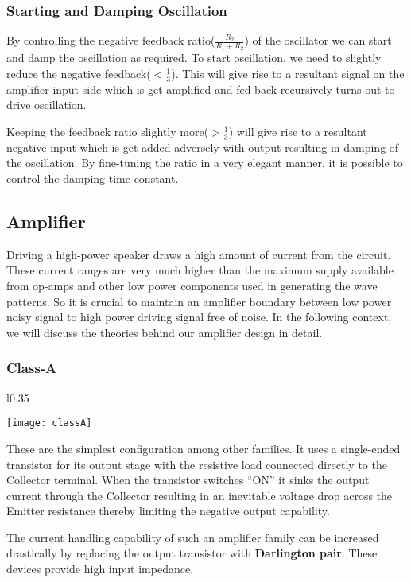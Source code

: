 \documentclass[class=article,crop=false]{standalone}
\begin{document}
\subsubsection*{Starting and Damping Oscillation}
By controlling the negative feedback ratio($\frac{R_2}{R_1+R_2}$) of the oscillator we can start and damp the oscillation as required. To start oscillation, we need to slightly reduce the negative feedback($<\frac{1}{3}$). This will give rise to a resultant signal on the amplifier input side which is get amplified and fed back recursively turns out to drive oscillation.
\par
Keeping the feedback ratio slightly more($>\frac{1}{3}$) will give rise to a resultant negative input which is get added adversely with output resulting in damping of the oscillation. By fine-tuning the ratio in a very elegant manner, it is possible to control the damping time constant.
\subsection{Amplifier}
Driving a high-power speaker draws a high amount of current from the circuit. These current ranges are very much higher than the maximum supply available from op-amps and other low power components used in generating the wave patterns. So it is crucial to maintain an amplifier boundary between low power noisy signal to high power driving signal free of noise. In the following context, we will discuss the theories behind our amplifier design in detail.
\subsubsection*{Class-A }
\begin{wrapfigure}{l}{0.35\columnwidth}
  \vspace*{-.5cm}
  \begin{center}
    \texttt{[image: classA]}
  \end{center}
  \vspace*{-.5cm}
\end{wrapfigure}
These are the simplest configuration among other families. It uses a single-ended transistor for its output stage with the resistive load connected directly to the Collector terminal. When the transistor switches “ON” it sinks the output current through the Collector resulting in an inevitable voltage drop across the Emitter resistance thereby limiting the negative output capability.  
\par 
The current handling capability of such an amplifier family can be increased drastically by replacing the output transistor with \textbf{Darlington pair}. These devices provide high input impedance.
\end{document}

